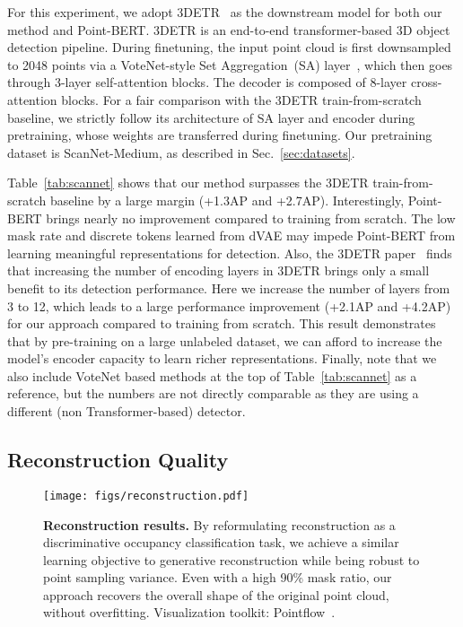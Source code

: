 \documentclass[runningheads]{llncs}
\begin{document}
For this experiment, we adopt 3DETR~\cite{misra2021-3detr} as the downstream model for both our method and Point-BERT. 3DETR is an end-to-end transformer-based 3D object detection pipeline.
During finetuning, the input point cloud is first downsampled to 2048 points via a VoteNet-style Set Aggregation~(SA) layer~\cite{qi2019deep,qi2017pointnetplusplus}, which then goes through 3-layer self-attention blocks. The decoder is composed of 8-layer cross-attention blocks. For a fair comparison with the 3DETR train-from-scratch baseline, we strictly follow its architecture of SA layer and encoder during pretraining, whose weights are transferred during finetuning.
Our pretraining dataset is ScanNet-Medium, as described in Sec.~\ref{sec:datasets}.

Table~\ref{tab:scannet} shows that our method surpasses the 3DETR train-from-scratch baseline by a large margin (+1.3AP and +2.7AP). Interestingly, Point-BERT brings nearly no improvement compared to training from scratch. The low mask rate and discrete tokens learned from dVAE may impede Point-BERT from learning meaningful representations for detection.
Also, the 3DETR paper~\cite{misra2021-3detr} finds that increasing the number of encoding layers in 3DETR brings only a small benefit to its detection performance. Here we increase the number of layers from 3 to 12, which leads to a large performance improvement (+2.1AP and +4.2AP) for our approach compared to training from scratch. This result demonstrates that by pre-training on a large unlabeled dataset, we can afford to increase the model's encoder capacity to learn richer representations. Finally, note that we also include VoteNet based methods at the top of Table~\ref{tab:scannet} as a reference, but the numbers are not directly comparable as they are using a different (non Transformer-based) detector.

\subsection{Reconstruction Quality}

\begin{figure}[t!]
    \centering
    \texttt{[image: figs/reconstruction.pdf]}
    \caption{\textbf{Reconstruction results.}
    By reformulating reconstruction as a discriminative occupancy classification task, we achieve a similar learning objective to generative reconstruction while being robust to point sampling variance.
    Even with a high 90\% mask ratio, our approach recovers the overall shape of the original point cloud, without overfitting. Visualization toolkit: Pointflow~\cite{pointflow}.
    }
    \label{fig:reconstruction}
\end{figure}
\end{document}
